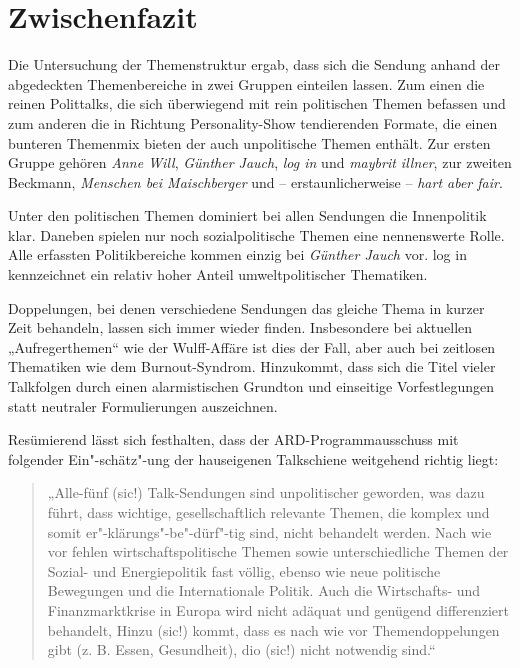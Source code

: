 \section{Zwischenfazit}

Die Untersuchung der Themenstruktur ergab, dass sich die Sendung anhand der abgedeckten Themenbereiche in zwei Gruppen einteilen lassen. Zum einen die reinen Polittalks, die sich überwiegend mit rein politischen Themen befassen und zum anderen die in Richtung Personality-Show tendierenden Formate, die einen bunteren Themenmix bieten der auch unpolitische Themen enthält. Zur ersten Gruppe gehören \textit{Anne Will}, \textit{Günther Jauch}, \textit{log in} und \textit{maybrit illner}, zur zweiten Beckmann, \textit{Menschen bei Maischberger} und – erstaunlicherweise – \textit{hart aber fair}.

Unter den politischen Themen dominiert bei allen Sendungen die Innenpolitik klar. Daneben spielen nur noch sozialpolitische Themen eine nennenswerte Rolle. Alle erfassten Politikbereiche kommen einzig bei \textit{Günther Jauch} vor. log in kennzeichnet ein relativ hoher Anteil umweltpolitischer Thematiken.

Doppelungen, bei denen verschiedene Sendungen das gleiche Thema in kurzer Zeit behandeln, lassen sich immer wieder finden. Insbesondere bei aktuellen „Aufregerthemen“ wie der Wulff-Affäre ist dies der Fall, aber auch bei zeitlosen Thematiken wie dem Burnout-Syndrom. Hinzukommt, dass sich die Titel vieler Talkfolgen durch einen alarmistischen Grundton und einseitige Vorfestlegungen statt neutraler Formulierungen auszeichnen.

Resümierend lässt sich festhalten, dass der ARD-Programmausschuss mit folgender Ein"-schätz"-ung der hauseigenen Talkschiene weitgehend richtig liegt:

\begin{quote}
	„Alle-fünf (sic!) Talk-Sendungen sind unpolitischer geworden, was dazu führt, dass wichtige, gesellschaftlich relevante Themen, die komplex und somit er"-klärungs"-be"-dürf"-tig sind, nicht behandelt werden. Nach wie vor fehlen wirtschaftspolitische Themen sowie unterschiedliche Themen der Sozial- und Energiepolitik fast völlig, ebenso wie neue politische Bewegungen und die Internationale Politik. Auch die Wirtschafts- und Finanzmarktkrise in Europa wird nicht adäquat und genügend differenziert behandelt, Hinzu (sic!) kommt, dass es nach wie vor Themendoppelungen gibt (z. B. Essen, Gesundheit), dio (sic!) nicht notwendig sind.“ \parencite{harbuschGeheimPapierARDKritisiert2012}
\end{quote}

